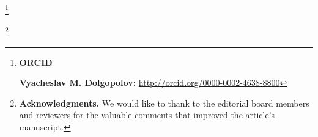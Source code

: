 \thanks{{\bf ORCID}



{\bf Vyacheslav M. Dolgopolov:} \url{http://orcid.org/0000-0002-4638-8800}



}





\thanks{{\bf Acknowledgments.} We would like to thank to the editorial board members and reviewers for the valuable comments that improved the article's manuscript.

}












\EngRef





